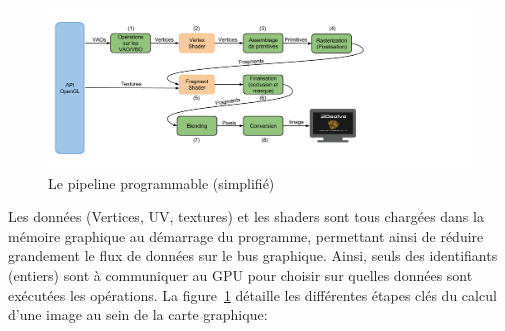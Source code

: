 \begin{figure}[h]
 \centering
 \includegraphics[scale=0.3,keepaspectratio=true]{img/pipeline.png}
 \caption{Le pipeline programmable (simplifié)}
 \label{pipeline}
\end{figure}

Les données (Vertices, UV, textures) et les shaders sont tous chargées dans la mémoire graphique au démarrage du programme, permettant ainsi de réduire grandement le flux de données sur le bus graphique. Ainsi, seuls des identifiants (entiers) sont à communiquer au GPU pour choisir sur quelles données sont exécutées les opérations.
    La figure~\ref{pipeline} détaille les différentes étapes clés du calcul d'une image au sein de la carte graphique:

